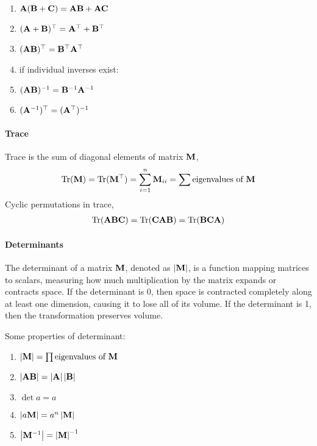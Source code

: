 \begin{enumerate}
	\item $\mathbf{A}(\mathbf{B}+\mathbf{C})=\mathbf{A}\mathbf{B}+\mathbf{A}\mathbf{C}$
	\item $(\mathbf{A}+\mathbf{B}){}^\top=\mathbf{A}{}^\top+\mathbf{B}{}^\top$
	\item $(\mathbf{A}\mathbf{B}){}^\top=\mathbf{B}{}^\top\mathbf{A}{}^\top$
	\item[] if individual inverses exist:
	\item $(\mathbf{A}\mathbf{B})^{-1}=\mathbf{B}^{-1}\mathbf{A}^{-1}$
	\item $(\mathbf{A}^{-1}){}^\top=(\mathbf{A}{}^\top)^{-1}$
\end{enumerate}

\paragraph{Trace}

Trace is the sum of diagonal elements of matrix $\mathbf{M}$,
\begin{align*}
	\Tr(\mat{M})=\Tr(\mat{M}\T)=\sum_{i=1}^n\mat{M}_{ii}=\sum\text{eigenvalues of $\mat{M}$}
\end{align*}
Cyclic permutations in trace,
\begin{align*}
	\Tr(\mat{A}\mat{B}\mat{C})=\Tr(\mat{C}\mat{A}\mat{B})=\Tr(\mat{B}\mat{C}\mat{A})
\end{align*}

\paragraph{Determinants}

The determinant of a matrix $\mathbf{M}$, denoted as $\left\vert \mathbf{M} \right\vert$, is a function mapping matrices to scalars, measuring how much multiplication by the matrix expands or contracts space. If the determinant is 0, then space is contracted completely along at least one dimension, causing it to lose all of its volume. If the determinant is 1, then the transformation preserves volume.

Some properties of determinant:
\begin{enumerate}
	\item $\left\vert \mathbf{M} \right\vert=\prod\text{eigenvalues of $\mathbf{M}$}$
	\item $\left\vert \mathbf{A}\mathbf{B} \right\vert=\left\vert \mathbf{A} \right\vert\left\vert \mathbf{B} \right\vert$
	\item $\det{a}=a$
	\item $\left\vert a\mathbf{M} \right\vert=a^n\left\vert \mathbf{M} \right\vert$
	\item $\left\vert \mathbf{M}^{-1} \right\vert=\left\vert \mathbf{M} \right\vert^{-1}$
\end{enumerate}

